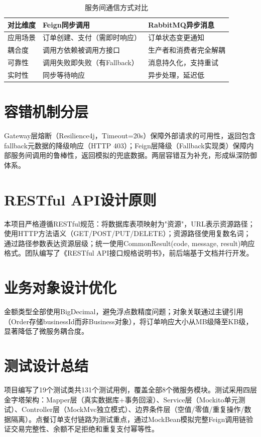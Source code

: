 \begin{table}[H]
	\centering
	\caption{服务间通信方式对比}
	\begin{tabular}{p{4.0cm}p{5.0cm}p{5.0cm}}
		\hline
		\textbf{对比维度} & \textbf{Feign同步调用} & \textbf{RabbitMQ异步消息} \\
		\hline
		应用场景 & 订单创建、支付（需即时响应） & 订单状态变更通知 \\
		耦合度 & 调用方依赖被调用方接口 & 生产者和消费者完全解耦 \\
		可靠性 & 调用失败即失败（有Fallback） & 消息持久化，支持重试 \\
		实时性 & 同步等待响应 & 异步处理，延迟低 \\
		\hline
	\end{tabular}
\end{table}

\section{容错机制分层}

Gateway层熔断（Resilience4j，Timeout=20s）保障外部请求的可用性，返回包含fallback元数据的降级响应（HTTP 403）；Feign层降级（Fallback实现类）保障内部服务间调用的鲁棒性，返回模拟的兜底数据。两层容错互为补充，形成纵深防御体系。

\section{RESTful API设计原则}

本项目严格遵循RESTful规范：将数据库表项映射为"资源"，URL表示资源路径；使用HTTP方法语义（GET/POST/PUT/DELETE）；资源路径使用复数名词；通过路径参数表达资源层级；统一使用CommonResult(code, message, result)响应格式。团队编写了《RESTful API接口规格说明书》，前后端基于文档并行开发。

\section{业务对象设计优化}

金额类型全部使用BigDecimal，避免浮点数精度问题；对象关联通过主键引用（Order存储businessId而非Business对象），将订单响应大小从MB级降至KB级，显著降低了微服务耦合度。

\section{测试设计总结}

项目编写了19个测试类共131个测试用例，覆盖全部8个微服务模块。测试采用四层金字塔架构：Mapper层（真实数据库+事务回滚）、Service层（Mockito单元测试）、Controller层（MockMvc独立模式）、边界条件层（空值/零值/重复操作/数据隔离）。点餐订单支付链路为测试重点，通过MockBean模拟完整Feign调用链验证交易完整性、余额不足拒绝和重复支付幂等性。


